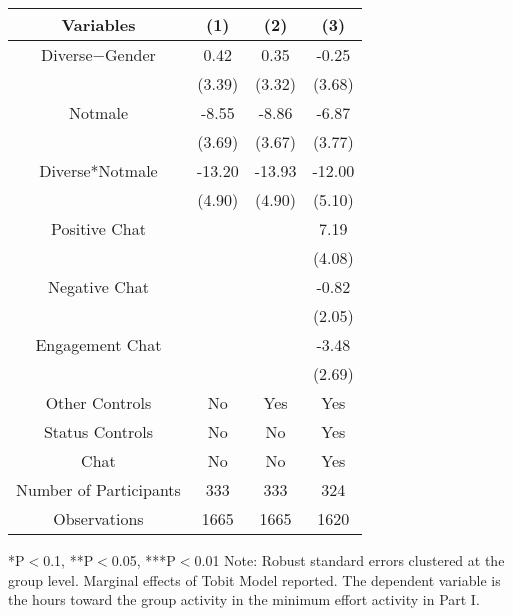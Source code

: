 \begin{table}[htbp]
    \begin{tabular}{c c c c}
    \toprule
    \textbf{Variables} & \textbf{(1)} & \textbf{(2)} & \textbf{(3)}         \\ 
\midrule
Diverse$-$Gender            &     0.42    &    0.35                               &  -0.25  \\
                            &     (3.39)  &    (3.32)                             &  (3.68) \\

Notmale                  &      -8.55\sym{**} &    -8.86\sym{**}             &  -6.87\sym{*}  \\
                            &      (3.69)         &    (3.67)                     &  (3.77) \\
Diverse*Notmale         &      -13.20\sym{***}   &  -13.93\sym{***}            &  -12.00\sym{**}\\
                            &      (4.90)         &    (4.90)                     &  (5.10) \\


Positive Chat                        &                     &                       &  7.19\sym{*}  \\
                                 &                     &                           &  (4.08)  \\
Negative  Chat                       &                     &                       &  -0.82  \\
                                 &                     &                           &  (2.05)  \\
Engagement Chat                      &                     &                       &  -3.48  \\
                                 &                     &                           &  (2.69)  \\
\midrule
Other Controls                   &    No               &    Yes                    &    Yes        \\
Status Controls                    &    No               &    No                   &    Yes        \\
Chat                             &    No               &    No                     &    Yes        \\
\midrule
Number of Participants           &    333               &    333                   &    324        \\
\midrule
Observations                     &       1665          &       1665                &  1620    \\
\bottomrule
\end{tabular}
\begin{footnotesize}
\newline
*P$<$0.1, **P$<$0.05, ***P$<$0.01
\newline
Note: Robust standard errors clustered at the group level. Marginal effects of Tobit Model reported.
\newline
The dependent variable is the hours toward the group activity in the minimum effort activity in Part I. 
\end{footnotesize}
\end{table}
